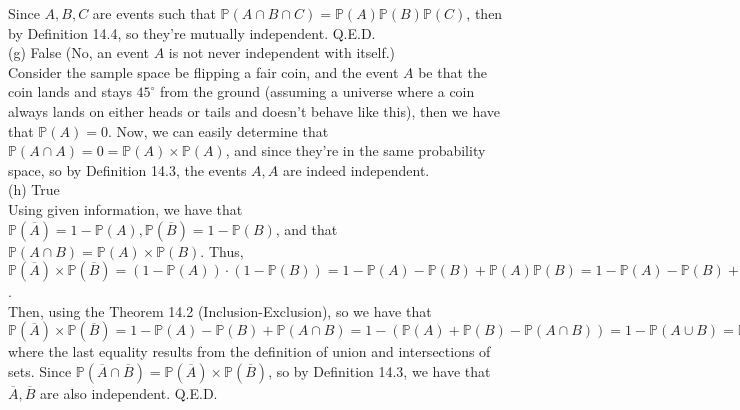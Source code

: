 \documentclass{article}
\begin{document}
Since $A, B, C$ are events such that $\mathbb{P}(A\cap B\cap C) = \mathbb{P}(A) \mathbb{P}(B) \mathbb{P}(C)$, then by Definition 14.4, so they're mutually independent. Q.E.D.\\[.5cm]
{\color{red} (g) False (No, an event $A$ is not never independent with itself.)} \\

Consider the sample space be flipping a fair coin, and the event $A$ be that the coin lands and stays $45^\circ$ from the ground (assuming a universe where a coin always lands on either heads or tails and doesn't behave like this), then we have that $\mathbb{P}(A) = 0$. Now, we can easily determine that $\mathbb{P}(A\cap A) = 0 = \mathbb{P}(A)\times\mathbb{P}(A)$, and since they're in the same probability space, so by Definition 14.3, the events $A, A$ are indeed independent. \\[.5cm]
{\color{red} (h) True} \\

Using given information, we have that
$\mathbb{P}(\overline{A}) = 1 - \mathbb{P}(A),
\mathbb{P}(\overline{B}) = 1 - \mathbb{P}(B)$, and that
$\mathbb{P}(A\cap B) = \mathbb{P}(A)\times\mathbb{P}(B)$. Thus,
$\mathbb{P}(\overline{A})\times\mathbb{P}(\overline{B}) =
(1 - \mathbb{P}(A))\cdot(1 - \mathbb{P}(B)) =
1 - \mathbb{P}(A) - \mathbb{P}(B) + \mathbb{P}(A)\mathbb{P}(B) =
1 - \mathbb{P}(A) - \mathbb{P}(B) + \mathbb{P}(A\cap B)$. \\

Then, using the Theorem 14.2 (Inclusion-Exclusion), so we have that
$\mathbb{P}(\overline{A})\times\mathbb{P}(\overline{B}) =
1 - \mathbb{P}(A) - \mathbb{P}(B) + \mathbb{P}(A\cap B) =
1 - (\mathbb{P}(A) + \mathbb{P}(B) - \mathbb{P}(A\cap B)) =
1 - \mathbb{P}(A\cup B) = \mathbb{P}(\overline{A}\cap\overline{B})$ where the last equality results from the definition of union and intersections of sets. Since $\mathbb{P}(\overline{A}\cap\overline{B}) = \mathbb{P}(\overline{A})\times\mathbb{P}(\overline{B})$, so by Definition 14.3, we have that $\overline{A}, \overline{B}$ are also independent. Q.E.D.
\end{document}
